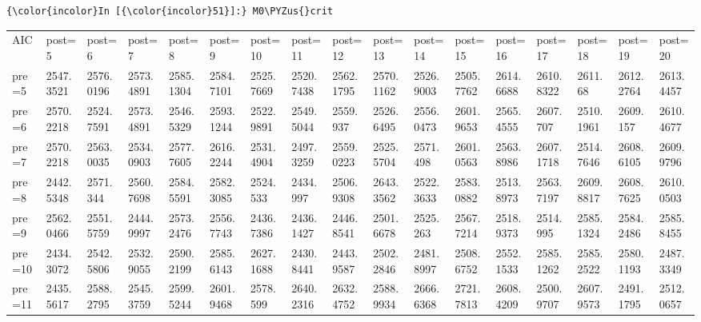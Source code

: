 \documentclass[11pt]{article}
\def\PYZus{\char`\_}
\begin{document}
    
    \begin{Verbatim}[commandchars=\\\{\}]
{\color{incolor}In [{\color{incolor}51}]:} M0\PYZus{}crit
\end{Verbatim}


    \begin{tabular}{lllllllllllllllll}
	 AIC         & post=5      & post=6      & post=7      & post=8      & post=9      & post=10     & post=11     & post=12     & post=13     & post=14     & post=15     & post=16     & post=17     & post=18     & post=19     & post=20    \\
	 pre=5       & 2547.3521   & 2576.0196   & 2573.4891   & 2585.1304   & 2584.7101   & 2525.7669   & 2520.7438   & 2562.1795   & 2570.1162   & 2526.9003   & 2505.7762   & 2614.6688   & 2610.8322   & 2611.68     & 2612.2764   & 2613.4457  \\
	 pre=6       & 2570.2218   & 2524.7591   & 2573.4891   & 2546.5329   & 2593.1244   & 2522.9891   & 2549.5044   & 2559.937    & 2526.6495   & 2556.0473   & 2601.9653   & 2565.4555   & 2607.707    & 2510.1961   & 2609.157    & 2610.4677  \\
	 pre=7       & 2570.2218   & 2563.0035   & 2534.0903   & 2577.7605   & 2616.2244   & 2531.4904   & 2497.3259   & 2559.0223   & 2525.5704   & 2571.498    & 2601.0563   & 2563.8986   & 2607.1718   & 2514.7646   & 2608.6105   & 2609.9796  \\
	 pre=8       & 2442.5348   & 2571.344    & 2560.7698   & 2584.5591   & 2582.3085   & 2524.533    & 2434.997    & 2506.9308   & 2643.3562   & 2522.3633   & 2583.0882   & 2513.8973   & 2563.7197   & 2609.8817   & 2608.7625   & 2610.0503  \\
	 pre=9       & 2562.0466   & 2551.5759   & 2444.9997   & 2573.2476   & 2556.7743   & 2436.7386   & 2436.1427   & 2446.8541   & 2501.6678   & 2525.263    & 2567.7214   & 2518.9373   & 2514.995    & 2585.1324   & 2584.2486   & 2585.8455  \\
	 pre=10      & 2434.3072   & 2542.5806   & 2532.9055   & 2590.2199   & 2585.6143   & 2627.1688   & 2430.8441   & 2443.9587   & 2502.2846   & 2481.8997   & 2508.6752   & 2552.1533   & 2585.1262   & 2585.2522   & 2580.1193   & 2487.3349  \\
	 pre=11      & 2435.5617   & 2588.2795   & 2545.3759   & 2599.5244   & 2601.9468   & 2578.599    & 2640.2316   & 2632.4752   & 2588.9934   & 2666.6368   & 2721.7813   & 2608.4209   & 2500.9707   & 2607.9573   & 2491.1795   & 2512.0657  \\

\end{tabular}
\end{document}
